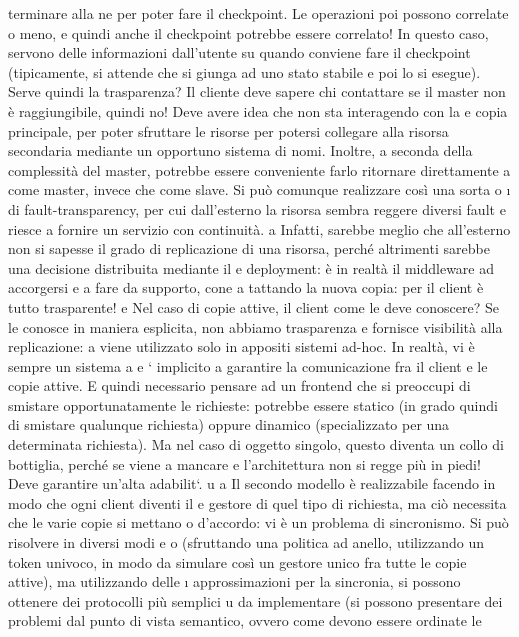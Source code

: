 \documentclass[a4paper,12pt]{article}
\begin{document}
terminare alla ne per poter fare il checkpoint.
Le operazioni poi possono correlate o meno, e quindi anche il checkpoint
potrebbe essere correlato! In questo caso, servono delle informazioni dall'utente
su quando conviene fare il checkpoint (tipicamente, si attende che si giunga ad
uno stato stabile e poi lo si esegue).
Serve quindi la trasparenza? Il cliente deve sapere chi contattare se il master
non è raggiungibile, quindi no! Deve avere idea che non sta interagendo con la
e
copia principale, per poter sfruttare le risorse per potersi collegare alla risorsa
secondaria mediante un opportuno sistema di nomi. Inoltre, a seconda della
complessità del master, potrebbe essere conveniente farlo ritornare direttamente
a
come master, invece che come slave. Si può comunque realizzare così una sorta
o
\i{}
di fault-transparency, per cui dall'esterno la risorsa sembra reggere diversi fault
e riesce a fornire un servizio con continuità.
a
Infatti, sarebbe meglio che all'esterno non si sapesse il grado di replicazione
di una risorsa, perché altrimenti sarebbe una decisione distribuita mediante il
e
deployment: è in realtà il middleware ad accorgersi e a fare da supporto, cone
a
tattando la nuova copia: per il client è tutto trasparente!
e
Nel caso di copie attive, il client come le deve conoscere? Se le conosce in
maniera esplicita, non abbiamo trasparenza e fornisce visibilità alla replicazione:
a
viene utilizzato solo in appositi sistemi ad-hoc. In realtà, vi è sempre un sistema
a
e
`
implicito a garantire la comunicazione fra il client e le copie attive. E quindi necessario pensare ad un frontend che
si preoccupi di smistare opportunatamente le
richieste: potrebbe essere statico (in grado quindi di smistare qualunque richiesta) oppure dinamico (specializzato per
una determinata richiesta). Ma nel caso
di oggetto singolo, questo diventa un collo di bottiglia, perché se viene a mancare
e
l'architettura non si regge più in piedi! Deve garantire un'alta adabilit`.
u
a
Il secondo modello è realizzabile facendo in modo che ogni client diventi il
e
gestore di quel tipo di richiesta, ma ciò necessita che le varie copie si mettano
o
d'accordo: vi è un problema di sincronismo. Si può risolvere in diversi modi
e
o
(sfruttando una politica ad anello, utilizzando un token univoco, in modo da
simulare così un gestore unico fra tutte le copie attive), ma utilizzando delle
\i{}
approssimazioni per la sincronia, si possono ottenere dei protocolli più semplici
u
da implementare (si possono presentare dei problemi dal punto di vista semantico, ovvero come devono essere ordinate le
\end{document}
